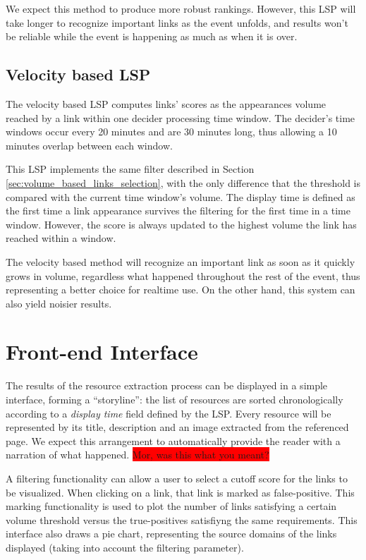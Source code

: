\documentclass{sig-alternate}
\newcommand{\todo}[1]{\colorbox{red}{#1}}
\begin{document}
We expect this method to produce more robust rankings. However, this LSP will take longer to recognize important links as the event unfolds, and results won't be reliable while the event is happening as much as when it is over.

\subsection{Velocity based LSP}
\label{sec:velocity_based_links_selection}
The velocity based LSP computes links' scores as the appearances volume reached by a link within one decider processing time window. The decider's time windows occur every 20 minutes and are 30 minutes long, thus allowing a 10 minutes overlap between each window.

This LSP implements the same filter described in Section \ref{sec:volume_based_links_selection}, with the only difference that the threshold is compared with the current time window's volume. The display time is defined as the first time a link appearance survives the filtering for the first time in a time window. However, the score is always updated to the highest volume the link has reached within a window.

The velocity based method will recognize an important link as soon as it quickly grows in volume, regardless what happened throughout the rest of the event, thus representing a better choice for realtime use. On the other hand, this system can also yield noisier results.

\section{Front-end Interface}
\label{sec:front-end-interface}
The results of the resource extraction process can be displayed in a simple interface, forming a ``storyline'': the list of resources are sorted chronologically according to a \emph{display time} field defined by the LSP. Every resource will be represented by its title, description and an image extracted from the referenced page. We expect this arrangement to automatically provide the reader with a narration of what happened. \todo{Mor, was this what you meant?}

A filtering functionality can allow a user to select a cutoff score for the links to be visualized. When clicking on a link, that link is marked as false-positive. This marking functionality is used to plot the number of links satisfying a certain volume threshold versus the true-positives satisfiyng the same requirements. This interface also draws a pie chart, representing the source domains of the links displayed (taking into account the filtering parameter).
\end{document}
